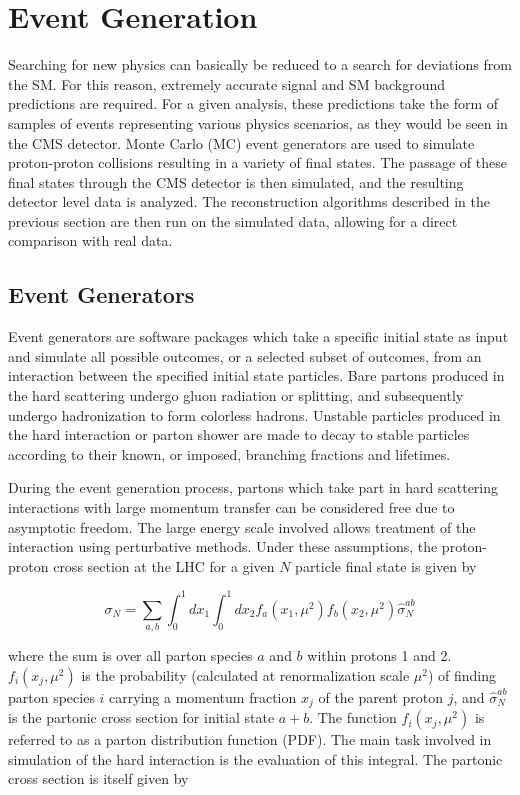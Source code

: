 \section{Event Generation}
Searching for new physics can basically be reduced to a search for deviations from the SM. For this reason, extremely accurate signal and SM background predictions are required. For a given analysis, these predictions take the form of samples of events representing various physics scenarios, as they would be seen in the CMS detector. Monte Carlo (MC) event generators are used to simulate proton-proton collisions resulting in a variety of final states. The passage of these final states through the CMS detector is then simulated, and the resulting detector level data is analyzed. The reconstruction algorithms described in the previous section are then run on the simulated data, allowing for a direct comparison with real data.

\subsection{Event Generators}
Event generators are software packages which take a specific initial state as input and simulate all possible outcomes, or a selected subset of outcomes, from an interaction between the specified initial state particles. Bare partons produced in the hard scattering undergo gluon radiation or splitting, and subsequently undergo hadronization to form colorless hadrons. Unstable particles produced in the hard interaction or parton shower are made to decay to stable particles according to their known, or imposed, branching fractions and lifetimes.

During the event generation process, partons which take part in hard scattering interactions with large momentum transfer can be considered free due to asymptotic freedom. The large energy scale involved allows treatment of the interaction using perturbative methods. Under these assumptions, the proton-proton cross section at the LHC for a given $N$ particle final state is given by

\begin{equation}
\sigma_{N} = \sum_{a,b}\int_{0}^{1}dx_{1}\int_{0}^{1}dx_{2}f_{a}(x_{1},\mu^{2})f_{b}(x_{2},\mu^{2})\hat{\sigma}_{N}^{ab}
\end{equation}

where the sum is over all parton species $a$ and $b$ within protons 1 and 2. $f_{i}(x_{j},\mu^{2})$ is the probability (calculated at renormalization scale $\mu^{2}$) of finding parton species $i$ carrying a momentum fraction $x_{j}$ of the parent proton $j$, and $\hat{\sigma}_{N}^{ab}$ is the partonic cross section for initial state $a+b$. The function $f_{i}(x_{j},\mu^{2})$ is referred to as a parton distribution function (PDF). The main task involved in simulation of the hard interaction is the evaluation of this integral. The partonic cross section is itself given by


